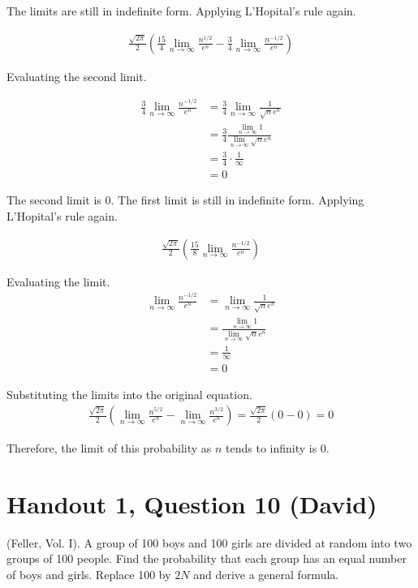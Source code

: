 \documentclass[11pt]{article}
\begin{document}
The limits are still in indefinite form. Applying L'Hopital's rule again. 

\begin{align*}
   \frac{\sqrt{2\pi}}{2}( \frac{15}{4}\lim_{n\to \infty} \frac{n^{1/2}}{e^n} -  \frac{3}{4}\lim_{n\to \infty} \frac{n^{-1/2}}{e^n})
\end{align*}

Evaluating the second limit. 

\begin{align*}
    \frac{3}{4}\lim_{n\to \infty} \frac{n^{-1/2}}{e^n} 
    &= 
    \frac{3}{4}\lim_{n\to \infty} \frac{1}{\sqrt{n}e^n}\\
    &=\frac{3}{4} \frac{\lim_{n\to \infty}1}{\lim_{n\to \infty} \sqrt{n}e^n}\\
    &=\frac{3}{4} \cdot \frac{1}{\infty}\\
    &=0
\end{align*}

The second limit is 0. The first limit is still in indefinite form. Applying L'Hopital's rule again. 

\begin{align*}
   \frac{\sqrt{2\pi}}{2}( \frac{15}{8}\lim_{n\to \infty} \frac{n^{-1/2}}{e^n})
\end{align*}

Evaluating the limit.
\begin{align*}
    \lim_{n\to \infty} \frac{n^{-1/2}}{e^n} &=\lim_{n\to \infty} \frac{1}{\sqrt{n}e^n}\\
    &= \frac{\lim_{n \to \infty} 1}{\lim_{n \to \infty} \sqrt{n}e^n}\\
    &= \frac{1}{\infty}\\
    &=0
\end{align*}

Substituting the limits into the original equation.
\begin{align*}
   \frac{\sqrt{2\pi}}{2}(\lim_{n\to \infty} \frac{n^{5/2}}{e^n} -  \lim_{n\to \infty} \frac{n^{3/2}}{e^n}) = \frac{\sqrt{2\pi}}{2}(0 -  0) = 0
\end{align*}


Therefore, the limit of this probability as \(n\) tends to infinity is 0. 


\section*{Handout 1, Question 10 (David)}

(Feller, Vol. I). A group of 100 boys and 100 girls are
divided at random into two groups of 100 people.
Find the probability that each group has an equal number
of boys and girls. Replace 100 by \(2N\) and derive a general
formula.
\end{document}
